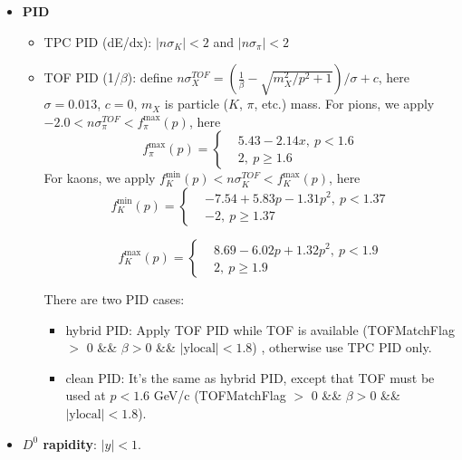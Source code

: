 \begin{itemize}
\item \textbf{PID}
\begin{itemize}
\item TPC PID (dE/dx): $|n\sigma_K| < 2$ and $|n\sigma_\pi| < 2$
\item TOF PID (1/$\beta$): define $n\sigma_X^{TOF} = ( \frac{1}{\beta} - \sqrt{m_X^2/p^2 + 1} )/\sigma + c$, here $\sigma = 0.013$, $c = 0$,  $m_X$ is particle ($K$, $\pi$, etc.) mass. For pions, we apply $-2.0 < n\sigma_\pi^{TOF} < f_\pi^{\mathrm{max}}(p)$, here
\begin{equation}
f_\pi^{\mathrm{max}}(p) = \left\{
\begin{aligned}
&5.43 - 2.14x, ~ p < 1.6  \\
&2, ~ p \geq 1.6
\end{aligned}
\right.
\label{eq:Run14nsigTofPi}
\end{equation}
For kaons, we apply $f_K^{\mathrm{min}}(p) < n\sigma_K^{TOF} < f_K^{\mathrm{max}}(p)$, here
\begin{equation}
f_K^{\mathrm{min}}(p) = \left\{
\begin{aligned}
&-7.54 + 5.83p - 1.31p^2, ~ p < 1.37  \\
&-2, ~ p \geq 1.37
\end{aligned}
\right.
\label{eq:Run14nsigTofK1}
\end{equation}

\begin{equation}
f_K^{\mathrm{max}}(p) = \left\{
\begin{aligned}
&8.69 - 6.02p + 1.32p^2, ~ p < 1.9  \\
&2, ~ p \geq 1.9
\end{aligned}
\right.
\label{eq:Run14nsigTofK1}
\end{equation}

There are two PID cases:
\begin{itemize}
\item hybrid PID: Apply TOF PID while TOF is available (TOFMatchFlag $>$ 0 \&\& $\beta > 0$ \&\& $|\mathrm{ylocal}| < 1.8$) , otherwise use TPC PID only.
\item clean PID: It's the same as hybrid PID, except that TOF must be used at $p < 1.6$ GeV/c (TOFMatchFlag $>$ 0 \&\& $\beta > 0$ \&\& $|\mathrm{ylocal}| < 1.8$). 
\end{itemize}
\end{itemize}

\item \textbf{$D^0$ rapidity}: $|y| < 1$.
\end{itemize}

